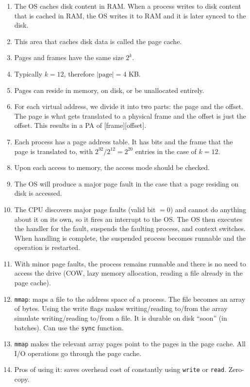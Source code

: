 \documentclass[12pt,a4paper]{article}
\begin{document}
\begin{enumerate}
  \item The OS caches disk content in RAM. When a process writes to disk content that is cached in RAM, the OS writes it to RAM and it is later synced to the disk.
  \item This area that caches disk data is called the page cache.
  \item Pages and frames have the same size $2^k$.
  \item Typically $k = 12$, therefore $|\text{page}| = 4$ KB.
  \item Pages can reside in memory, on disk, or be unallocated entirely.
  \item For each virtual address, we divide it into two parts: the page and the offset. The page is what gets translated to a physical frame and the offset is just the offset. This results in a PA of [frame][offset].
  \item Each process has a page address table. It has bits and the frame that the page is translated to, with $2^{32}/2^{12} = 2^{20}$ entries in the case of $k = 12$.
  \item Upon each access to memory, the access mode should be checked.
  \item The OS will produce a major page fault in the case that a page residing on disk is accessed.
  \item The CPU discovers major page faults (valid bit $= 0$) and cannot do anything about it on its own, so it fires an interrupt to the OS. The OS then executes the handler for the fault, suspends the faulting process, and context switches. When handling is complete, the suspended process becomes runnable and the operation is restarted.
  \item With minor page faults, the process remains runnable and there is no need to access the drive (COW, lazy memory allocation, reading a file already in the page cache).
  \item \texttt{mmap}: maps a file to the address space of a process. The file becomes an array of bytes. Using the write flags makes writing/reading to/from the array simulate writing/reading to/from a file. It is durable on disk ``soon'' (in batches). Can use the \texttt{sync} function.
  \item \texttt{mmap} makes the relevant array pages point to the pages in the page cache. All I/O operations go through the page cache.
  \item Pros of using it: saves overhead cost of constantly using \texttt{write} or \texttt{read}. Zero-copy.

\end{enumerate}
\end{document}

